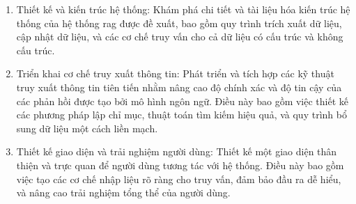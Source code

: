 \begin{enumerate}
    \item Thiết kế và kiến trúc hệ thống: Khám phá chi tiết và tài liệu hóa kiến trúc hệ thống của hệ thống \gls{rag} được đề xuất, bao gồm quy trình trích xuất dữ liệu, cập nhật dữ liệu, và các cơ chế truy vấn cho cả dữ liệu có cấu trúc và không cấu trúc.
    \item Triển khai cơ chế truy xuất thông tin: Phát triển và tích hợp các kỹ thuật truy xuất thông tin tiên tiến nhằm nâng cao độ chính xác và độ tin cậy của các phản hồi được tạo bởi mô hình ngôn ngữ. Điều này bao gồm việc thiết kế các phương pháp lập chỉ mục, thuật toán tìm kiếm hiệu quả, và quy trình bổ sung dữ liệu một cách liền mạch.
    \item Thiết kế giao diện và trải nghiệm người dùng: Thiết kế một giao diện thân thiện và trực quan để người dùng tương tác với hệ thống. Điều này bao gồm việc tạo các cơ chế nhập liệu rõ ràng cho truy vấn, đảm bảo đầu ra dễ hiểu, và nâng cao trải nghiệm tổng thể của người dùng.
\end{enumerate}
